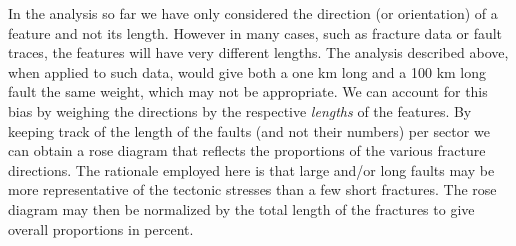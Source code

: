 	In the analysis so far we have only considered the direction (or orientation) of a feature and not its length.
However in many cases, such as fracture data or fault traces, the features will have very different lengths.  
The analysis described above, when applied to such data, would give both a one km long and a 100 km long fault
the same weight, which may not be appropriate.  We 
can account for this bias by weighing the directions by the respective \emph{lengths} of the features.  By keeping 
track of the length of the faults (and not their numbers) per sector we can obtain a rose diagram that 
reflects the proportions of the various fracture directions.  The rationale employed here is that large and/or 
long faults may be more representative of the tectonic stresses than a few short fractures.  The 
rose diagram may then be normalized by the total length of the fractures to give overall proportions in 
percent.

